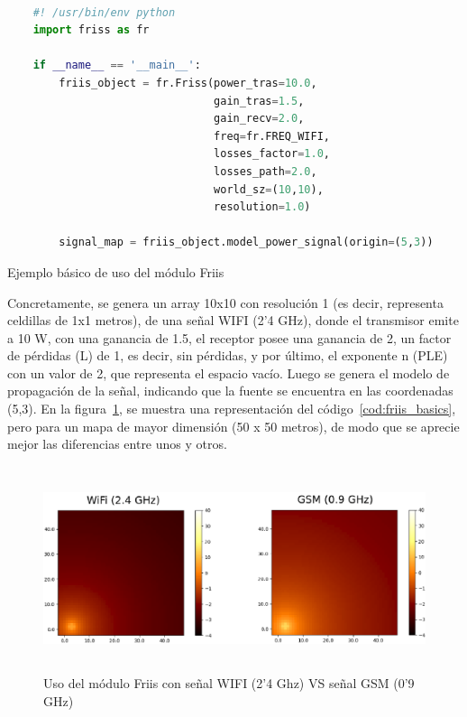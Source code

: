 \begin{code}[H]
    \begin{lstlisting}[language=Python]

    #! /usr/bin/env python
    import friss as fr

    if __name__ == '__main__':
        friis_object = fr.Friss(power_tras=10.0,
                                gain_tras=1.5,
                                gain_recv=2.0,
                                freq=fr.FREQ_WIFI,
                                losses_factor=1.0,
                                losses_path=2.0,
                                world_sz=(10,10),
                                resolution=1.0)

        signal_map = friis_object.model_power_signal(origin=(5,3))

\end{lstlisting}
\caption[Ejemplo básico de uso del módulo Friis]{Ejemplo básico de uso del módulo Friis}
\label{cod:friis_basics}
\end{code}

Concretamente, se genera un array 10x10 con resolución 1 (es decir, representa celdillas de 1x1 metros), de una señal WIFI (2'4 GHz), donde el transmisor emite a 10 W, con una ganancia de 1.5, el receptor posee una ganancia de 2, un factor de pérdidas (L) de 1, es decir, sin pérdidas, y por último, el exponente n (\ac{PLE}) con un valor de 2, que representa el espacio vacío. Luego se genera el modelo de propagación de la señal, indicando que la fuente se encuentra en las coordenadas (5,3). En la figura~\ref{fig:heat_ex}, se muestra una representación del código~\ref{cod:friis_basics}, pero para un mapa de mayor dimensión (50 x 50 metros), de modo que se aprecie mejor las diferencias entre unos y otros.\\

\begin{figure} [t]
	\begin{center}
	\includegraphics[height=6cm]{imagenes/cap4/4_heatmap_example.png}
	\end{center}
	\caption[Uso del módulo Friis con señal WIFI (2'4 Ghz) VS señal GSM (0'9 GHz)]{Uso del módulo Friis con señal WIFI (2'4 Ghz) VS señal GSM (0'9 GHz)}
	\label{fig:heat_ex}
\end{figure}

